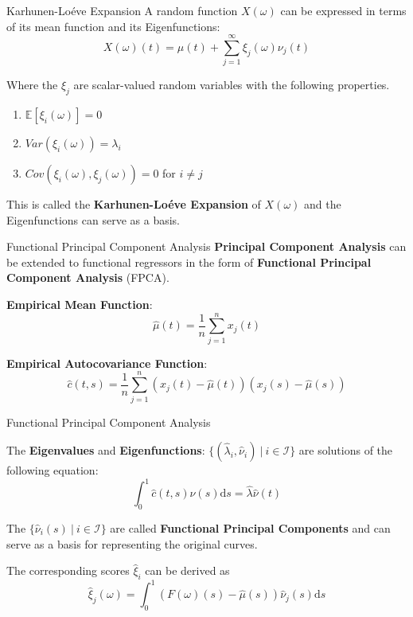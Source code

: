 \documentclass{beamer}
\begin{document}
	\begin{frame}{Karhunen-Lo\'{e}ve Expansion}\label{KLE}
		A random function $X(\omega)$ can be expressed in terms of its mean function and its Eigenfunctions:
		$$X(\omega)(t) = \mu(t) + \sum_{j = 1}^{\infty} \xi_j(\omega) \nu_j(t)$$
		
		Where the $\xi_j$ are scalar-valued random variables with the following properties.
		\begin{multicols}{2}
			\begin{enumerate}
				\item $\mathbb{E}[\xi_i(\omega)] = 0$
				\item $Var(\xi_i(\omega)) = \lambda_i$
				\item $Cov(\xi_i(\omega), \xi_j(\omega)) = 0$ for $i \neq j$
			\end{enumerate}
		\end{multicols}
		
		This is called the \textbf{Karhunen-Lo\'{e}ve Expansion} of $X(\omega)$ and the Eigenfunctions can serve as a basis. \\
		
		\hyperlink{spectral}{}
	\end{frame}

	\begin{frame}{Functional Principal Component Analysis}
		\textbf{Principal Component Analysis} can be extended to functional regressors in the form of \textbf{Functional Principal Component Analysis} (FPCA).
		\vspace{0.4cm}
		
		\textbf{Empirical Mean Function}:
		$$\hat{\mu}(t) = \frac{1}{n}\sum_{j = 1}^{n}x_j(t)$$

		\textbf{Empirical Autocovariance Function}:
		$$\hat{c}(t,s) = \frac{1}{n} \sum_{j = 1}^{n} \left(x_j(t) - \hat{\mu}(t)\right) \left(x_j(s) - \hat{\mu}(s)\right)$$

	\end{frame}

	\begin{frame}{Functional Principal Component Analysis}\label{FPCA}
	
		The \textbf{Eigenvalues} and \textbf{Eigenfunctions}: $\{(\hat{\lambda}_i, \hat{\nu}_i) \: \vert \: i \in \mathcal{I}\}$  are solutions of the following equation:
		$$ \int_{0}^{1}\hat{c}(t,s)\hat{\nu}(s) \mathrm{d}s = \hat{\lambda} \hat{\nu}(t) $$
		\vspace{0.2cm}
		
		The $\{\hat{\nu}_i(s) \: \vert \: i \in \mathcal{I}\}$ are called \textbf{Functional Principal Components} and can serve as a basis for representing the original curves. 
		\vspace{0.2cm}
		
		The corresponding scores $\hat{\xi}_i$ can be derived as
		$$\hat{\xi}_j(\omega) = \int_{0}^{1} (F(\omega)(s) - \hat{\mu}(s)) \hat{\nu}_j(s) \mathrm{d}s$$
		
		\hyperlink{PCA}{}
	\end{frame}
\end{document}

